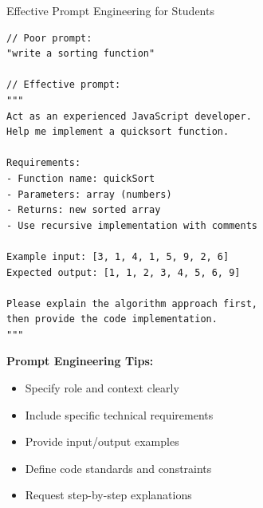 \documentclass{beamer}
\begin{document}
\begin{frame}[t,fragile]{Effective Prompt Engineering for Students}
    \begin{lstlisting}[style=code, caption={Structured Prompt Template}]
// Poor prompt:
"write a sorting function"

// Effective prompt:
"""
Act as an experienced JavaScript developer. 
Help me implement a quicksort function.

Requirements:
- Function name: quickSort
- Parameters: array (numbers)
- Returns: new sorted array
- Use recursive implementation with comments

Example input: [3, 1, 4, 1, 5, 9, 2, 6]
Expected output: [1, 1, 2, 3, 4, 5, 6, 9]

Please explain the algorithm approach first, 
then provide the code implementation.
"""
    \end{lstlisting}
    
    \textbf{Prompt Engineering Tips:}
    \begin{itemize}
        \item Specify role and context clearly
        \item Include specific technical requirements
        \item Provide input/output examples
        \item Define code standards and constraints
        \item Request step-by-step explanations
    \end{itemize}
\end{frame}
\end{document}
